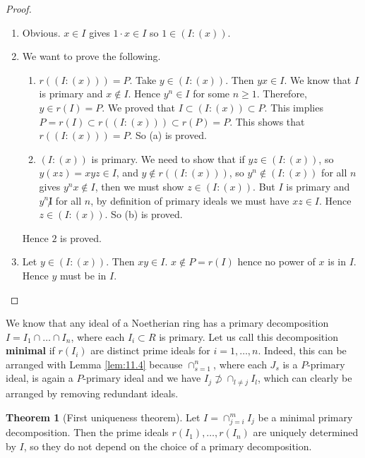 \documentclass{article}
\newcommand{\rb}[1]{\left( #1 \right)}
\theoremstyle{definition}\newtheorem{definition}{Definition}[section]
\theoremstyle{definition}\newtheorem{remark}[definition]{Remark}
\theoremstyle{definition}\newtheorem*{example}{Example}
\theoremstyle{definition}\newtheorem*{note}{Note}
\newtheorem{theorem}[definition]{Theorem}
\begin{document}
\begin{proof}
\hfill
\begin{enumerate}
\item Obvious. $ x \in I $ gives $ 1 \cdot x \in I $ so $ 1 \in \rb{I : \rb{x}} $.
\item We want to prove the following.
\begin{enumerate}
\item $ r\rb{\rb{I : \rb{x}}} = P $. Take $ y \in \rb{I : \rb{x}} $. Then $ yx \in I $. We know that $ I $ is primary and $ x \notin I $. Hence $ y^n \in I $ for some $ n \ge 1 $. Therefore, $ y \in r\rb{I} = P $. We proved that $ I \subset \rb{I : \rb{x}} \subset P $. This implies $ P = r\rb{I} \subset r\rb{\rb{I : \rb{x}}} \subset r\rb{P} = P $. This shows that $ r\rb{\rb{I : \rb{x}}} = P $. So (a) is proved.
\item $ \rb{I : \rb{x}} $ is primary. We need to show that if $ yz \in \rb{I : \rb{x}} $, so $ y\rb{xz} = xyz \in I $, and $ y \notin r\rb{\rb{I : \rb{x}}} $, so $ y^n \notin \rb{I : \rb{x}} $ for all $ n $ gives $ y^nx \notin I $, then we must show $ z \in \rb{I : \rb{x}} $. But $ I $ is primary and $ y^n \not I $ for all $ n $, by definition of primary ideals we must have $ xz \in I $. Hence $ z \in \rb{I : \rb{x}} $. So (b) is proved.
\end{enumerate}
Hence $ 2 $ is proved.
\item Let $ y \in \rb{I : \rb{x}} $. Then $ xy \in I $. $ x \notin P = r\rb{I} $ hence no power of $ x $ is in $ I $. Hence $ y $ must be in $ I $.
\end{enumerate}
\end{proof}

We know that any ideal of a Noetherian ring has a primary decomposition $ I = I_1 \cap \dots \cap I_n $, where each $ I_i \subset R $ is primary. Let us call this decomposition \textbf{minimal} if $ r\rb{I_i} $ are distinct prime ideals for $ i = 1, \dots, n $. Indeed, this can be arranged with Lemma \ref{lem:11.4} because $ \cap_{s = 1}^n $, where each $ J_s $ is a $ P $-primary ideal, is again a $ P $-primary ideal and we have $ I_j \not\supset \cap_{l \ne j} I_l $, which can clearly be arranged by removing redundant ideals.

\begin{theorem}[First uniqueness theorem]
Let $ I = \cap_{j = i}^m I_j $ be a minimal primary decomposition. Then the prime ideals $ r\rb{I_1}, \dots, r\rb{I_n} $ are uniquely determined by $ I $, so they do not depend on the choice of a primary decomposition.
\end{theorem}
\end{document}
